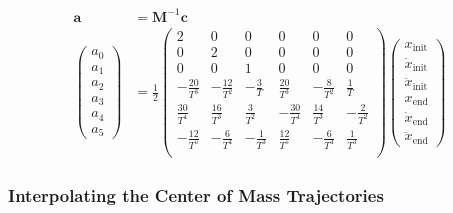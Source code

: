 \begin{align}
	\bm{a} &= \bm{M}^{-1}\bm{c} \\
	\begin{pmatrix}
		a_0 \\
		a_1 \\
		a_2 \\
		a_3 \\
		a_4 \\
	a_5
	\end{pmatrix} &= 
	\frac{1}{2}
	\begin{pmatrix}
		2 & 0 & 0 & 0 & 0 & 0 \\
		0 & 2 & 0 & 0 & 0 & 0 \\
		0 & 0 & 1 & 0 & 0 & 0 \\
		-\frac{20}{T^3} & -\frac{12}{T^2} & -\frac{3}{T} & \frac{20}{T^3} & -\frac{8}{T^2} & \frac{1}{T} \\
		\frac{30}{T^4} & \frac{16}{T^3} & \frac{3}{T^2} & -\frac{30}{T^4} & \frac{14}{T^3} & -\frac{2}{T^2} \\
		-\frac{12}{T^5} & -\frac{6}{T^4} & -\frac{1}{T^3} & \frac{12}{T^5} & -\frac{6}{T^4} & \frac{1}{T^3} \\
	\end{pmatrix}
	\begin{pmatrix}
		x_\text{init} \\
		\dot{x}_\text{init} \\
		\ddot{x}_\text{init} \\
		x_\text{end} \\
		\dot{x}_\text{end} \\
		\ddot{x}_\text{end} 
	\end{pmatrix}
\end{align}
\subsubsection{Interpolating the Center of Mass Trajectories}